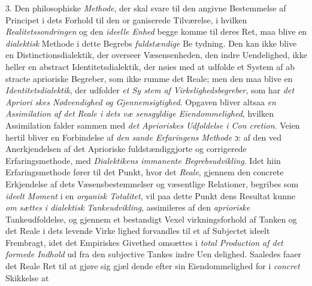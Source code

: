 3. Den philosophiske \emph{Methode}, der skal svare til den
angivne Bestemmelse af Principet i dets Forhold til den or\-%
ganiserede Tilværelse, i hvilken \emph{Realitetssondringen} og
den \emph{ideelle Enhed} begge komme til deres Ret, maa blive
en \emph{dialektisk} Methode i dette Begrebs \emph{fuldstændige} Be\-%
tydning. Den kan ikke blive en Distinctionsdialektik, der overseer
Væsensenheden, den indre Uendelighed, ikke heller en abstract
Identitetsdialektik, der nøies med at udfolde et System af ab\-%
stracte aprioriske Begreber, som ikke rumme det Reale; men
den maa blive en \emph{Identitetsdialektik}, der udfolder \emph{et Sy\-%
stem af Virkelighedsbegreber}, som har \emph{det Apriori\-%
skes Nødvendighed og Gjennemsigtighed}. Opgaven
bliver altsaa \emph{en Assimilation af det Reale i dets væ\-%
sensgyldige Eiendommelighed}, hvilken Assimilation
falder sammen med \emph{det Aprioriskes Udfoldelse i Con\-%
cretion}. Veien hertil bliver en Forbindelse af \emph{den sande
Erfaringens Methode} ɔ: af den ved Anerkjendelsen af det
Aprioriske fuldstændiggjorte og corrigerede Erfaringsmethode, med
\emph{Dialektikens immanente Begrebsudvikling}. Idet hiin
Erfaringsmethode fører til det Punkt, hvor det \emph{Reale}, gjennem
den concrete Erkjendelse af dets Væsensbestemmelser og væsentlige
Relationer, begribes som \emph{ideelt Moment} i en \emph{organisk
Totalitet}, vil paa dette Punkt dens Resultat kunne \emph{om\-%
sættes i dialektisk Tankeudvikling}, assimileres af den
\emph{aprioriske} Tankeudfoldelse, og gjennem et bestandigt Vexel\-%
virkningsforhold af Tanken og det Reale i dets levende Virke\-%
lighed forvandles til et af Subjectet ideelt Frembragt, idet det
Empiriskes Givethed omsættes i \emph{total Production af det
formede Indhold} ud fra den subjective Tankes indre Uen\-%
delighed. Saaledes faaer det Reale Ret til at gjøre sig gjæl\-%
dende efter sin Eiendommelighed for i \emph{concret} Skikkelse at
